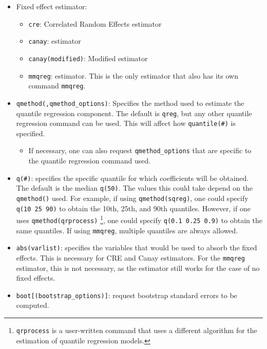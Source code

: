 \documentclass[bib]{statapress}
\providecommand{\tightlist}{%
  \setlength{\itemsep}{0pt}\setlength{\parskip}{0pt}}\usepackage{longtable,booktabs,array}
\begin{document}
\begin{itemize}
\tightlist
\item
  Fixed effect estimator:

  \begin{itemize}
  \tightlist
  \item
    \texttt{cre}: Correlated Random Effects estimator
  \item
    \texttt{canay}: \citet{canay2011} estimator
  \item
    \texttt{canay(modified)}: Modified \citet{canay2011} estimator
  \item
    \texttt{mmqreg}: \citet{mss2019} estimator. This is the only
    estimator that also has its own command \texttt{mmqreg}.
  \end{itemize}
\item
  \texttt{qmethod(,qmethod\_options)}: Specifies the method used to
  estimate the quantile regression component. The default is
  \texttt{qreg}, but any other quantile regression command can be used.
  This will affect how \texttt{quantile(\#)} is specified.

  \begin{itemize}
  \tightlist
  \item
    If necessary, one can also request \texttt{qmethod\_options} that
    are specific to the quantile regression command used.
  \end{itemize}
\item
  \texttt{q(\#)}: specifies the specific quantile for which coefficients
  will be obtained. The default is the median \texttt{q(50)}. The values
  this could take depend on the \texttt{qmethod()} used. For example, if
  using \texttt{qmethod(sqreg)}, one could specify
  \texttt{q(10\ 25\ 90)} to obtain the 10th, 25th, and 90th quantiles.
  However, if one uses \texttt{qmethod(qrprocess)} \footnote{\texttt{qrprocess}
    is a user-written command that uses a different algorithm for the
    estimation of quantile regression models.}, one could specify
  \texttt{q(0.1\ 0.25\ 0.9)} to obtain the same quantiles. If using
  \texttt{mmqreg}, multiple quantiles are always allowed.
\item
  \texttt{abs(varlist)}: specifies the variables that would be used to
  absorb the fixed effects. This is necessary for CRE and Canay
  estimators. For the \texttt{mmqreg} estimator, this is not necessary,
  as the estimator still works for the case of no fixed effects.
\item
  \texttt{boot{[}(bootstrap\_options){]}}: request bootstrap standard
  errors to be computed.


\end{itemize}
\end{document}
